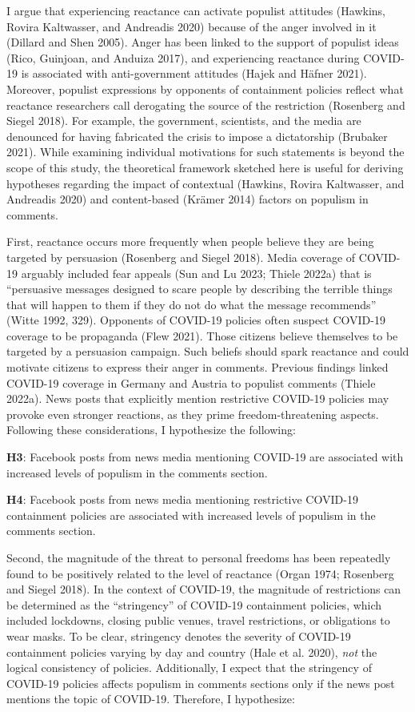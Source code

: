 \documentclass[
]{ccr}
\begin{document}
I argue that experiencing reactance can activate populist attitudes
(Hawkins, Rovira Kaltwasser, and Andreadis 2020) because of the anger
involved in it (Dillard and Shen 2005). Anger has been linked to the
support of populist ideas (Rico, Guinjoan, and Anduiza 2017), and
experiencing reactance during COVID-19 is associated with
anti-government attitudes (Hajek and Häfner 2021). Moreover, populist
expressions by opponents of containment policies reflect what reactance
researchers call derogating the source of the restriction (Rosenberg and
Siegel 2018). For example, the government, scientists, and the media are
denounced for having fabricated the crisis to impose a dictatorship
(Brubaker 2021). While examining individual motivations for such
statements is beyond the scope of this study, the theoretical framework
sketched here is useful for deriving hypotheses regarding the impact of
contextual (Hawkins, Rovira Kaltwasser, and Andreadis 2020) and
content-based (Krämer 2014) factors on populism in comments.

First, reactance occurs more frequently when people believe they are
being targeted by persuasion (Rosenberg and Siegel 2018). Media coverage
of COVID-19 arguably included fear appeals (Sun and Lu 2023; Thiele
2022a) that is ``persuasive messages designed to scare people by
describing the terrible things that will happen to them if they do not
do what the message recommends'' (Witte 1992, 329). Opponents of
COVID-19 policies often suspect COVID-19 coverage to be propaganda (Flew
2021). Those citizens believe themselves to be targeted by a persuasion
campaign. Such beliefs should spark reactance and could motivate
citizens to express their anger in comments. Previous findings linked
COVID-19 coverage in Germany and Austria to populist comments (Thiele
2022a). News posts that explicitly mention restrictive COVID-19 policies
may provoke even stronger reactions, as they prime freedom-threatening
aspects. Following these considerations, I hypothesize the following:

\textbf{H3}: Facebook posts from news media mentioning COVID-19 are
associated with increased levels of populism in the comments section.

\textbf{H4}: Facebook posts from news media mentioning restrictive
COVID-19 containment policies are associated with increased levels of
populism in the comments section.

Second, the magnitude of the threat to personal freedoms has been
repeatedly found to be positively related to the level of reactance
(Organ 1974; Rosenberg and Siegel 2018). In the context of COVID-19, the
magnitude of restrictions can be determined as the ``stringency'' of
COVID-19 containment policies, which included lockdowns, closing public
venues, travel restrictions, or obligations to wear masks. To be clear,
stringency denotes the severity of COVID-19 containment policies varying
by day and country (Hale et al. 2020), \emph{not} the logical
consistency of policies. Additionally, I expect that the stringency of
COVID-19 policies affects populism in comments sections only if the news
post mentions the topic of COVID-19. Therefore, I hypothesize:
\end{document}
